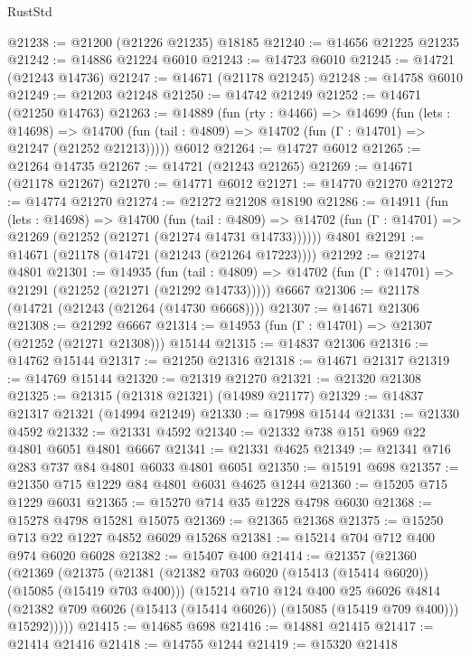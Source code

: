 \begin{lexlean}{RustStd}
\begin{coremodule}
@21238 := @21200 (@21226 @21235) @18185
@21240 := @14656 @21225 @21235
@21242 := @14886 @21224 @6010
@21243 := @14723 @6010
@21245 := @14721 (@21243 @14736)
@21247 := @14671 (@21178 @21245)
@21248 := @14758 @6010
@21249 := @21203 @21248
@21250 := @14742 @21249
@21252 := @14671 (@21250 @14763)
@21263 := @14889
    (fun (rty : @4466) =>
    @14699
      (fun (lets : @14698) =>
      @14700 (fun (tail : @4809) => @14702 (fun (Γ : @14701) => @21247 (@21252 @21213)))))
    @6012
@21264 := @14727 @6012
@21265 := @21264 @14735
@21267 := @14721 (@21243 @21265)
@21269 := @14671 (@21178 @21267)
@21270 := @14771 @6012
@21271 := @14770 @21270
@21272 := @14774 @21270
@21274 := @21272 @21208 @18190
@21286 := @14911
    (fun (lets : @14698) =>
    @14700
      (fun (tail : @4809) =>
      @14702 (fun (Γ : @14701) => @21269 (@21252 (@21271 (@21274 @14731 @14733))))))
    @4801
@21291 := @14671 (@21178 (@14721 (@21243 (@21264 @17223))))
@21292 := @21274 @4801
@21301 := @14935
    (fun (tail : @4809) => @14702 (fun (Γ : @14701) => @21291 (@21252 (@21271 (@21292 @14733)))))
    @6667
@21306 := @21178 (@14721 (@21243 (@21264 (@14730 @6668))))
@21307 := @14671 @21306
@21308 := @21292 @6667
@21314 := @14953 (fun (Γ : @14701) => @21307 (@21252 (@21271 @21308))) @15144
@21315 := @14837 @21306
@21316 := @14762 @15144
@21317 := @21250 @21316
@21318 := @14671 @21317
@21319 := @14769 @15144
@21320 := @21319 @21270
@21321 := @21320 @21308
@21325 := @21315 (@21318 @21321) (@14989 @21177)
@21329 := @14837 @21317 @21321 (@14994 @21249)
@21330 := @17998 @15144
@21331 := @21330 @4592
@21332 := @21331 @4592
@21340 := @21332 @738 @151 @969 @22 @4801 @6051 @4801 @6667
@21341 := @21331 @4625
@21349 := @21341 @716 @283 @737 @84 @4801 @6033 @4801 @6051
@21350 := @15191 @698
@21357 := @21350 @715 @1229 @84 @4801 @6031 @4625 @1244
@21360 := @15205 @715 @1229 @6031
@21365 := @15270 @714 @35 @1228 @4798 @6030
@21368 := @15278 @4798 @15281 @15075
@21369 := @21365 @21368
@21375 := @15250 @713 @22 @1227 @4852 @6029 @15268
@21381 := @15214 @704 @712 @400 @974 @6020 @6028
@21382 := @15407 @400
@21414 := @21357
    (@21360
      (@21369
        (@21375
          (@21381
            (@21382 @703 @6020 (@15413 (@15414 @6020)) (@15085 (@15419 @703 @400)))
            (@15214
              @710
              @124
              @400
              @25
              @6026
              @4814
              (@21382 @709 @6026 (@15413 (@15414 @6026)) (@15085 (@15419 @709 @400)))
              @15292)))))
@21415 := @14685 @698
@21416 := @14881 @21415
@21417 := @21414 @21416
@21418 := @14755 @1244
@21419 := @15320 @21418

\end{coremodule}
\end{lexlean}
